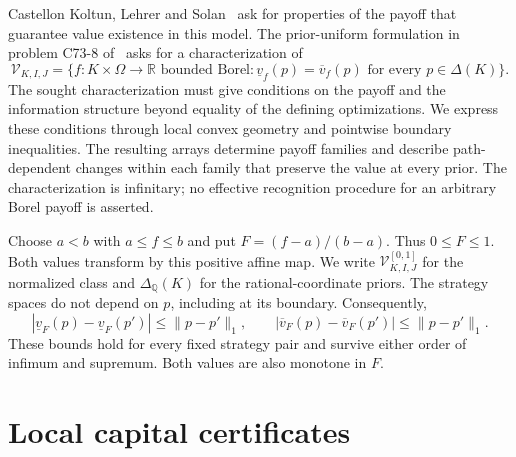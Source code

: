 \documentclass[11pt,a4paper]{article}
\theoremstyle{definition}
\theoremstyle{remark}
\newcommand{\R}{\mathbb R}
\newcommand{\lv}{\underline v}
\newcommand{\uv}{\overline v}
\newcommand{\VV}{\mathcal V}
\begin{document}
Castellon Koltun, Lehrer and Solan~\cite[Section~5]{KLS} ask for properties of
the payoff that guarantee value existence in this model. The
prior-uniform formulation in problem C73-8 of~\cite{Catalogue} asks
for a characterization of
\[
 \VV_{K,I,J}
 =\{f:K\times\Omega\to\R\text{ bounded Borel}:
           \lv_f(p)=\uv_f(p)\text{ for every }p\in\Delta(K)\}.
\]
The sought characterization must give conditions on the payoff and the
information structure beyond equality of the defining optimizations.
We express these conditions through local convex geometry and pointwise
boundary inequalities. The resulting arrays determine payoff families
and describe path-dependent changes within each family that preserve
the value at every prior.
The characterization is infinitary; no effective recognition
procedure for an arbitrary Borel payoff is asserted.

Choose $a<b$ with $a\leq f\leq b$ and put $F=(f-a)/(b-a)$. Thus
$0\leq F\leq1$. Both values transform by this positive affine map.
We write $\VV^{[0,1]}_{K,I,J}$ for the normalized class and
$\Delta_{\mathbb Q}(K)$ for the rational-coordinate priors. The
strategy spaces do not depend on $p$, including at its boundary.
Consequently,
\begin{equation}\label{eq:lipschitz}
 |\lv_F(p)-\lv_F(p')|\leq\|p-p'\|_1,\qquad
 |\uv_F(p)-\uv_F(p')|\leq\|p-p'\|_1.
\end{equation}
These bounds hold for every fixed strategy pair and survive either
order of infimum and supremum. Both values are also monotone in $F$.

\section{Local capital certificates}\label{sec:certificates}
\end{document}
